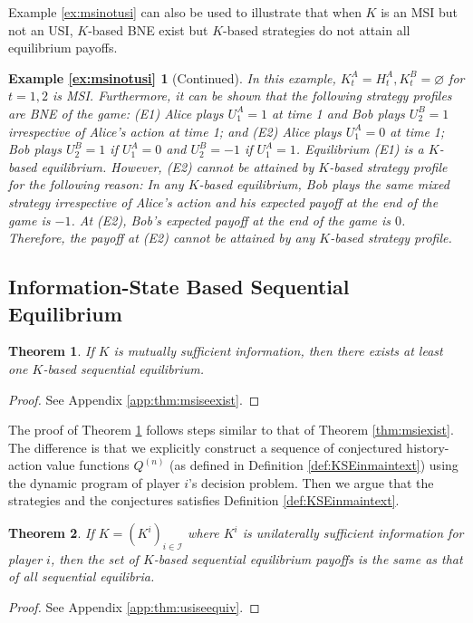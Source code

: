 \documentclass[pdflatex,sn-basic]{sn-jnl}
\newcommand{\Qfunc}{Q}
\newcommand{\Comp}{K}
\theoremstyle{thmstyleone}%
\newtheorem{thm}{Theorem}
\theoremstyle{thmstyletwo}%
\theoremstyle{thmstylethree}%
\begin{document}
Example \ref{ex:msinotusi} can also be used to illustrate that when $\Comp$ is an MSI but not an USI, $\Comp$-based BNE exist but $\Comp$-based strategies do not attain all equilibrium payoffs. 
\theoremstyle{thmstylethree}
\newtheorem*{example*}{Example \ref{ex:msinotusi}}
\begin{example*}[Continued]
    {In this example, $\Comp_t^A = H_t^A, \Comp_t^B = \varnothing$ for $t=1,2$ is MSI. Furthermore, it can be shown that the following strategy profiles are BNE of the game: (E1) Alice plays $U_1^A=1$ at time 1 and Bob plays $U_2^B=1$ irrespective of Alice's action at time 1; and (E2) Alice plays $U_1^A=0$ at time 1; Bob plays $U_2^B = 1$ if $U_1^A=0$ and $U_2^B=-1$ if $U_1^A=1$. Equilibrium (E1) is a $\Comp$-based equilibrium. However, (E2) cannot be attained by $\Comp$-based strategy profile for the following reason: In any $\Comp$-based equilibrium, Bob plays the same mixed strategy irrespective of Alice's action and his expected payoff at the end of the game is $-1$. At (E2), Bob's expected payoff at the end of the game is $0$. Therefore, the payoff at (E2) cannot be attained by any $\Comp$-based strategy profile.} 
\end{example*}

\subsection{Information-State Based Sequential Equilibrium}\label{sec:sieqref} 
\begin{thm}\label{thm:msiseexist}
	If $\Comp$ is mutually sufficient information, then there exists at least one $\Comp$-based sequential equilibrium.
\end{thm}
\begin{proof}
    See Appendix \ref{app:thm:msiseexist}.
\end{proof}

The proof of Theorem \ref{thm:msiseexist} follows steps similar to that of Theorem \ref{thm:msiexist}. The difference is that we explicitly construct a sequence of conjectured history-action value functions $\Qfunc^{(n)}$ (as defined in Definition \ref{def:KSEinmaintext}) using the dynamic program of player $i$'s decision problem. Then we argue that the strategies and the conjectures satisfies Definition \ref{def:KSEinmaintext}.

\begin{thm}\label{thm:usiseequiv}
	If $\Comp=(\Comp^i)_{i\in\mathcal{I}}$ where $\Comp^i$ is unilaterally sufficient information for player $i$, then the set of $\Comp$-based sequential equilibrium payoffs is the same as that of all sequential equilibria.
\end{thm}
\begin{proof}
    See Appendix \ref{app:thm:usiseequiv}.
\end{proof}
\end{document}
